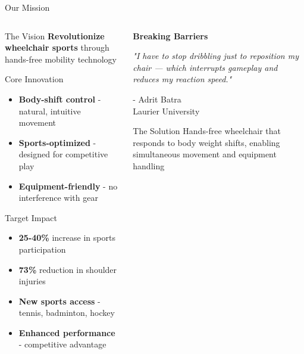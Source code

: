 \documentclass[aspectratio=169]{beamer}
\begin{document}
\begin{frame}{Our Mission}
\begin{columns}[T]
\begin{column}{0.6\textwidth}
\vspace{-0.3cm}
\begin{block}{The Vision}
\Large \textbf{Revolutionize wheelchair sports} through hands-free mobility technology
\end{block}

\vspace{-0.2cm}
\begin{block}{Core Innovation}
\begin{itemize}
    \item \textbf{Body-shift control} - natural, intuitive movement
    \item \textbf{Sports-optimized} - designed for competitive play
    \item \textbf{Equipment-friendly} - no interference with gear
\end{itemize}
\end{block}

\vspace{-0.2cm}
\begin{block}{Target Impact}
\begin{itemize}
    \item \textbf{25-40\%} increase in sports participation
    \item \textbf{73\%} reduction in shoulder injuries
    \item \textbf{New sports access} - tennis, badminton, hockey
    \item \textbf{Enhanced performance} - competitive advantage
\end{itemize}
\end{block}
\end{column}

\begin{column}{0.38\textwidth}
\begin{center}
\Large \textbf{Breaking Barriers}

\vspace{0.3cm}
\normalsize
\textit{"I have to stop dribbling just to reposition my chair — which interrupts gameplay and reduces my reaction speed."}

\vspace{0.3cm}
- Adrit Batra\\
Laurier University

\vspace{0.2cm}
\begin{block}{The Solution}
Hands-free wheelchair that responds to body weight shifts, enabling simultaneous movement and equipment handling
\end{block}
\end{center}
\end{column}
\end{columns}
\end{frame}
\end{document}
